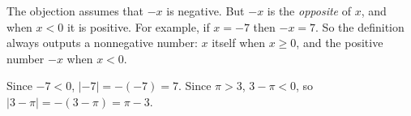 The objection assumes that $-x$ is negative. But $-x$ is the \emph{opposite} of $x$, and when $x<0$ it is positive. For example, if $x=-7$ then $-x=7$. So the definition always outputs a nonnegative number: $x$ itself when $x\ge0$, and the positive number $-x$ when $x<0$.

Since $-7<0$, $|-7|=-(-7)=\boxed{7}$. Since $\pi>3$, $3-\pi<0$, so $|3-\pi|=-(3-\pi)=\boxed{\pi-3}$.
